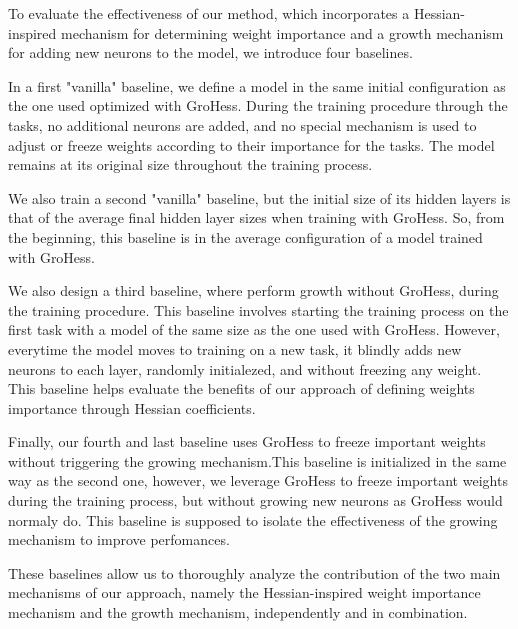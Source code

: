 \documentclass[11pt]{article}
\begin{document}

To evaluate the effectiveness of our method, which incorporates a Hessian-inspired mechanism for determining weight importance and a growth mechanism for adding new neurons to the model, we introduce four baselines.

\vspace{2mm}
\noindent
In a first "vanilla" baseline, we define a model in the same initial configuration as the one used optimized with GroHess. During the training procedure through the tasks, no additional neurons are added, and no special mechanism is used to adjust or freeze weights according to their importance for the tasks. The model remains at its original size throughout the training process.

\vspace{2mm}
\noindent
We also train a second "vanilla" baseline, but the initial size of its hidden layers is that of the average final hidden layer sizes when training with GroHess. So, from the beginning, this baseline is in the average configuration of a model trained with GroHess. 

\vspace{2mm}
\noindent
We also design a third baseline, where perform growth without GroHess, during the training procedure. This baseline involves starting the training process on the first task with a model of the same size as the one used with GroHess. However, everytime the model moves to training on a new task, it blindly adds new neurons to each layer, randomly initialezed, and without freezing any weight. This baseline helps evaluate the benefits of our approach of defining weights importance through Hessian coefficients. 

\vspace{2mm}
\noindent
Finally, our fourth and last baseline uses GroHess to freeze important weights without triggering the growing mechanism.This baseline is initialized in the same way as the second one, however, we leverage GroHess to freeze important weights during the training process, but without growing new neurons as GroHess would normaly do. This baseline is supposed to isolate the effectiveness of the growing mechanism to improve perfomances.

\vspace{2mm}
\noindent
These baselines allow us to thoroughly analyze the contribution of the two main mechanisms of our approach, namely the Hessian-inspired weight importance mechanism and the growth mechanism, independently and in combination.
\end{document}
